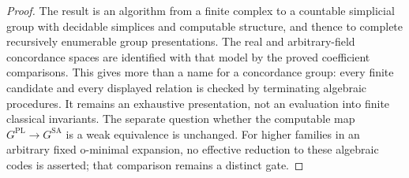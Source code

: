 \begin{proof}
The result is an algorithm from a finite complex to a countable
simplicial group with decidable simplices and computable structure,
and thence to complete recursively enumerable group presentations.
The real and arbitrary-field concordance spaces are identified with
that model by the proved coefficient comparisons. This gives more
than a name for a concordance group: every finite candidate and
every displayed relation is checked by terminating algebraic
procedures. It remains an exhaustive presentation, not an evaluation
into finite classical invariants. The separate question whether the
computable map $G^{\mathrm{PL}}\to G^{\mathrm{SA}}$ is a weak
equivalence is unchanged. For higher families in an arbitrary
fixed o-minimal expansion, no effective reduction to these algebraic
codes is asserted; that comparison remains a distinct gate.
\end{proof}
